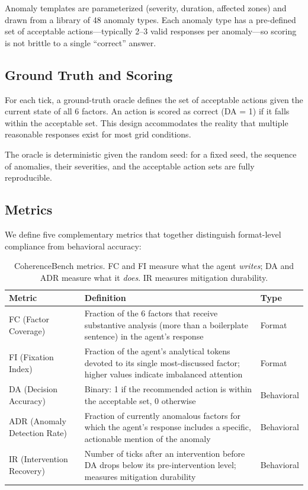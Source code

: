 \documentclass{article}
\begin{document}
Anomaly templates are parameterized (severity, duration, affected zones)
and drawn from a library of 48 anomaly types. Each anomaly type has a
pre-defined set of acceptable actions---typically 2--3 valid responses
per anomaly---so scoring is not brittle to a single ``correct'' answer.

\subsection{Ground Truth and Scoring}

For each tick, a ground-truth oracle defines the set of acceptable
actions given the current state of all 6 factors. An action is scored as
correct (DA = 1) if it falls within the acceptable set. This design
accommodates the reality that multiple reasonable responses exist for
most grid conditions.

The oracle is deterministic given the random seed: for a fixed seed, the
sequence of anomalies, their severities, and the acceptable action sets
are fully reproducible.

\subsection{Metrics}
\label{sec:metrics}

We define five complementary metrics that together distinguish
format-level compliance from behavioral accuracy:

\begin{table}[h]
\centering
\caption{CoherenceBench metrics. FC and FI measure what the agent
\emph{writes}; DA and ADR measure what it \emph{does}. IR measures
mitigation durability.}
\label{tab:metrics}
\begin{tabular}{@{}lp{7cm}l@{}}
\toprule
\textbf{Metric} & \textbf{Definition} & \textbf{Type} \\
\midrule
FC (Factor Coverage) & Fraction of the 6 factors that receive
substantive analysis (more than a boilerplate sentence) in the agent's
response & Format \\
FI (Fixation Index) & Fraction of the agent's analytical tokens devoted
to its single most-discussed factor; higher values indicate imbalanced
attention & Format \\
DA (Decision Accuracy) & Binary: 1 if the recommended action is within
the acceptable set, 0 otherwise & Behavioral \\
ADR (Anomaly Detection Rate) & Fraction of currently anomalous factors
for which the agent's response includes a specific, actionable mention of
the anomaly & Behavioral \\
IR (Intervention Recovery) & Number of ticks after an intervention before
DA drops below its pre-intervention level; measures mitigation durability
& Behavioral \\
\bottomrule
\end{tabular}
\end{table}
\end{document}
